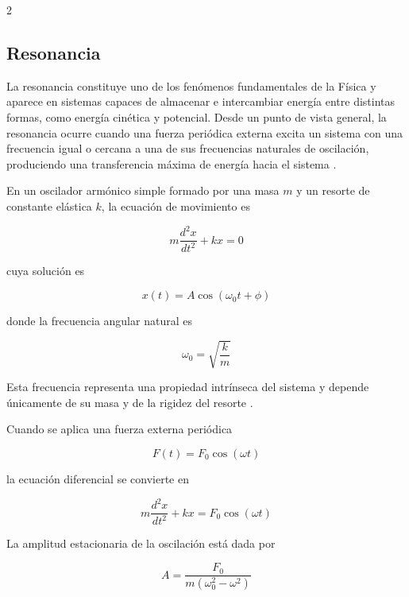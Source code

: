 \documentclass[10pt]{article}
\begin{document}
\begin{multicols}{2}

\subsection{Resonancia}

La resonancia constituye uno de los fenómenos fundamentales de la Física y aparece en sistemas capaces de almacenar e intercambiar energía entre distintas formas, como energía cinética y potencial. Desde un punto de vista general, la resonancia ocurre cuando una fuerza periódica externa excita un sistema con una frecuencia igual o cercana a una de sus frecuencias naturales de oscilación, produciendo una transferencia máxima de energía hacia el sistema \citep{Serway2018}.

En un oscilador armónico simple formado por una masa $m$ y un resorte de constante elástica $k$, la ecuación de movimiento es

\begin{equation}
m\frac{d^{2}x}{dt^{2}}+kx=0
\end{equation}

cuya solución es

\begin{equation}
x(t)=A\cos(\omega_{0}t+\phi)
\end{equation}

donde la frecuencia angular natural es

\begin{equation}
\omega_{0}=\sqrt{\frac{k}{m}}
\end{equation}

Esta frecuencia representa una propiedad intrínseca del sistema y depende únicamente de su masa y de la rigidez del resorte \citep{Halliday2014}.

Cuando se aplica una fuerza externa periódica

\begin{equation}
F(t)=F_{0}\cos(\omega t)
\end{equation}

la ecuación diferencial se convierte en

\begin{equation}
m\frac{d^{2}x}{dt^{2}}+kx=F_{0}\cos(\omega t)
\end{equation}

La amplitud estacionaria de la oscilación está dada por

\begin{equation}
A=\frac{F_{0}}{m(\omega_{0}^{2}-\omega^{2})}
\end{equation}


\end{multicols}
\end{document}
